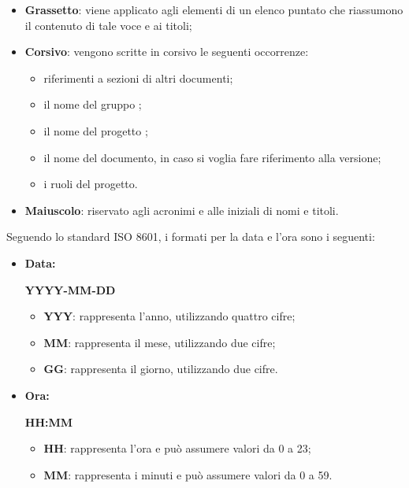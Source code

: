 \vspace{-0.5cm}
\begin{itemize}
	\item \textbf{Grassetto}: viene applicato agli elementi di un elenco puntato che riassumono il contenuto di tale voce e ai titoli;
	\item \textbf{Corsivo}: vengono scritte in corsivo le seguenti occorrenze:
	\begin{itemize}
		\item riferimenti a sezioni di altri documenti;
		\item il nome del gruppo \Omicron ;
		\item il nome del progetto \nameproject ;
		\item il nome del documento, in caso si voglia fare riferimento alla versione;
		\item i ruoli del progetto.
	\end{itemize}
	\item \textbf{Maiuscolo}: riservato agli acronimi e alle iniziali di nomi e titoli.
\end{itemize}

Seguendo lo standard ISO 8601, i formati per la data e l'ora sono i seguenti:
\begin{itemize}
	\item \textbf{Data:}
		\begin{center}
			\textbf{YYYY-MM-DD}
		\end{center}
		\begin{itemize}
			\item \textbf{YYY}: rappresenta l'anno, utilizzando quattro cifre;
			\item \textbf{MM}: rappresenta il mese, utilizzando due cifre;
			\item \textbf{GG}: rappresenta il giorno, utilizzando due cifre.
		\end{itemize}
	\item \textbf{Ora:}
		\begin{center}
			\textbf{HH:MM}
		\end{center}
		\begin{itemize}
			\item \textbf{HH}: rappresenta l'ora e può assumere valori da 0 a 23;
			\item \textbf{MM}: rappresenta i minuti e può assumere valori da 0 a 59.
		\end{itemize}
\end{itemize}